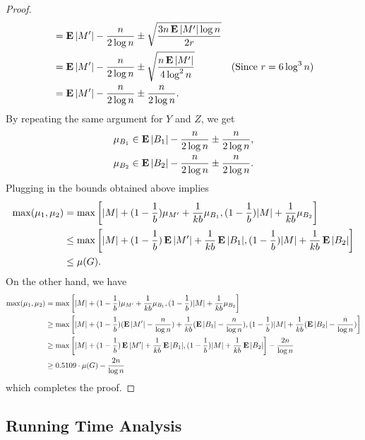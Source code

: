 \documentclass[letterpaper,11pt]{article}
\DeclareMathOperator{\E}{\ensuremath{\normalfont \textbf{E}}}
\begin{document}
\begin{proof}
\begin{align*}
        &= \E|M'| - \frac{n}{2\log n} \pm \sqrt{\frac{3n \E|M'| \log n}{2r}}\\
        & = \E|M'| - \frac{n}{2\log n} \pm \sqrt{\frac{n \E|M'|}{4\log^2 n}} & (\text{Since  $r = 6 \log^3 n$})\\
        & = \E|M'| - \frac{n}{2\log n} \pm \frac{n}{2\log n}.
    \end{align*}
    By repeating the same argument for $Y$ and $Z$, we get
    \begin{align*}
        \mu_{B_1} \in  \E|B_1| - \frac{n}{2\log n} \pm \frac{n}{2\log n}, \\
        \mu_{B_2} \in  \E|B_2| - \frac{n}{2\log n} \pm \frac{n}{2\log n}.
    \end{align*}
    Plugging  in the bounds obtained above implies
    \begin{align*}
        \max(\mu_1, \mu_2) &= \max \left[|M| + (1 - \frac{1}{b}) \mu_{M'} + \frac{1}{kb} \mu_{B_1}, (1 - \frac{1}{b}) |M| + \frac{1}{kb} \mu_{B_2} \right]\\
        & \leq \max \left[|M| + (1 - \frac{1}{b}) \E|M'| + \frac{1}{kb} \E|B_1|, (1 - \frac{1}{b}) |M| + \frac{1}{kb} \E|B_2| \right]\\
        & \leq \mu(G).
    \end{align*}
    On the other hand, we have
    \begin{align*}
        \max(\mu_1, \mu_2) &= \max \left[|M| + (1 - \frac{1}{b}) \mu_{M'} + \frac{1}{kb} \mu_{B_1}, (1 - \frac{1}{b}) |M| + \frac{1}{kb} \mu_{B_2} \right]\\
        & \geq \max \left[|M| + (1 - \frac{1}{b}) (\E|M'| - \frac{n}{\log n}) + \frac{1}{kb} (\E|B_1|- \frac{n}{\log n}), (1 - \frac{1}{b}) |M| + \frac{1}{kb} (\E|B_2|- \frac{n}{\log n}) \right]\\
        & \geq \max \left[|M| + (1 - \frac{1}{b}) \E|M'|  + \frac{1}{kb} \E|B_1|, (1 - \frac{1}{b}) |M| + \frac{1}{kb} \E|B_2| \right] - \frac{2n}{\log n}\\
        & \geq 0.5109\cdot \mu(G) - \frac{2n}{\log n}
    \end{align*}
    which completes the proof.
\end{proof}












\subsection{Running Time Analysis}
\end{document}
